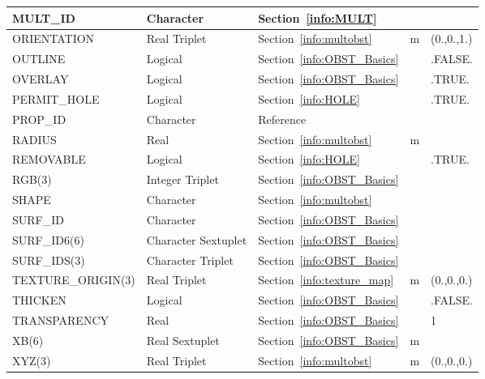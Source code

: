 \documentclass[11pt]{book}
\begin{document}
\begin{longtable}{@{\extracolsep{\fill}}|l|l|l|l|l|}
{\ct MULT\_ID }           & Character           & Section~\ref{info:MULT}                   &           &               \\ \hline
{\ct ORIENTATION}         & Real Triplet        & Section~\ref{info:multobst}               & m         & (0.,0.,1.)    \\ \hline
{\ct OUTLINE}             & Logical             & Section~\ref{info:OBST_Basics}            &           & {\ct .FALSE.} \\ \hline
{\ct OVERLAY}             & Logical             & Section~\ref{info:OBST_Basics}            &           & {\ct .TRUE.}  \\ \hline
{\ct PERMIT\_HOLE}        & Logical             & Section~\ref{info:HOLE}                   &           & {\ct .TRUE.}  \\ \hline
{\ct PROP\_ID}            & Character           & Reference~\cite{Smokeview_Users_Guide}    &           &               \\ \hline
{\ct RADIUS}              & Real                & Section~\ref{info:multobst}               & m         &               \\ \hline
{\ct REMOVABLE}           & Logical             & Section~\ref{info:HOLE}                   &           & {\ct .TRUE.}  \\ \hline
{\ct RGB(3)}              & Integer Triplet     & Section~\ref{info:OBST_Basics}            &           &               \\ \hline
{\ct SHAPE}               & Character           & Section~\ref{info:multobst}               &           &               \\ \hline
{\ct SURF\_ID}            & Character           & Section~\ref{info:OBST_Basics}            &           &               \\ \hline
{\ct SURF\_ID6(6)}        & Character Sextuplet & Section~\ref{info:OBST_Basics}            &           &               \\ \hline
{\ct SURF\_IDS(3)}        & Character Triplet   & Section~\ref{info:OBST_Basics}            &           &               \\ \hline
{\ct TEXTURE\_ORIGIN(3)}  & Real Triplet        & Section~\ref{info:texture_map}            & m         & (0.,0.,0.)    \\ \hline
{\ct THICKEN}             & Logical             & Section~\ref{info:OBST_Basics}            &           & {\ct .FALSE.} \\ \hline
{\ct TRANSPARENCY}        & Real                & Section~\ref{info:OBST_Basics}            &           &  1            \\ \hline
{\ct XB(6) }              & Real Sextuplet      & Section~\ref{info:OBST_Basics}            & m         &               \\ \hline
{\ct XYZ(3) }             & Real Triplet        & Section~\ref{info:multobst}               & m         & (0.,0.,0.)    \\ \hline
\end{longtable}
\end{document}
